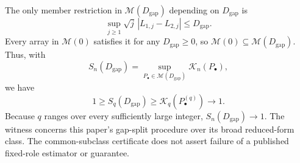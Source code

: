 The only member restriction in \(\mathcal M(D_{\mathrm{gap}})\) depending on \(D_{\mathrm{gap}}\) is
\[
 \sup_{j\geq1}\sqrt j\,|L_{1,j}-L_{2,j}|\leq D_{\mathrm{gap}}.
\]
Every array in \(\mathcal M(0)\) satisfies it for any \(D_{\mathrm{gap}}\geq0\), so \(\mathcal M(0)\subseteq\mathcal M(D_{\mathrm{gap}})\).  Thus, with
\[
 S_n(D_{\mathrm{gap}})=\sup_{P_\bullet\in\mathcal M(D_{\mathrm{gap}})}\mathcal K_n(P_\bullet),
\]
we have
\[
 1\geq S_q(D_{\mathrm{gap}})\geq\mathcal K_q(P_\bullet^{(q)})\to1.
\]
Because \(q\) ranges over every sufficiently large integer, \(S_n(D_{\mathrm{gap}})\to1\).  The witness concerns this paper's gap-split procedure over its broad reduced-form class.  The common-subclass certificate does not assert failure of a published fixed-role estimator or guarantee.
